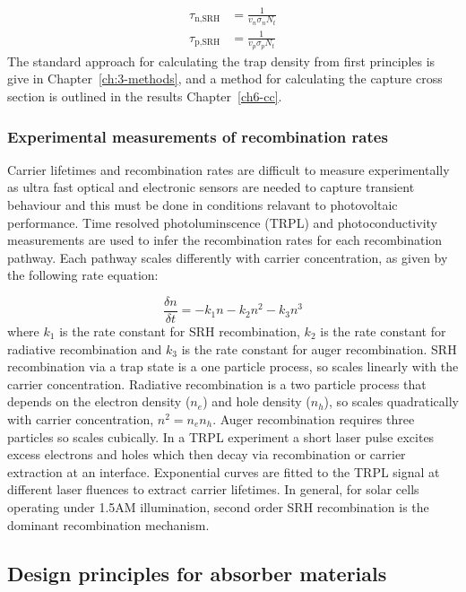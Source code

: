 \begin{align}
\tau_\textrm{n,SRH} &= \frac{1}{v_n\sigma_nN_t} \\
\tau_\textrm{p,SRH} &= \frac{1}{v_p\sigma_pN_t}  
\end{align}
The standard approach for calculating the trap density from first principles is give in Chapter\ \ref{ch:3-methods}, and a method for calculating the capture cross section is outlined in the results Chapter\ \ref{ch6-cc}.

\subsubsection{Experimental measurements of recombination rates} 

Carrier lifetimes and recombination rates are difficult to measure experimentally as ultra fast optical and electronic sensors are needed to capture transient behaviour and this must be done in conditions relavant to photovoltaic performance. Time resolved photoluminscence (TRPL) and photoconductivity measurements are used to infer the recombination rates for each recombination pathway.
Each pathway scales differently with carrier concentration, as given by the following rate equation:

$$ \frac{\delta n}{\delta t} = -k_1n -k_2n^2 -k_3n^3 $$
where $k_1$ is the rate constant for SRH recombination, $k_2$ is the rate constant for radiative recombination and $k_3$ is the rate constant for auger recombination. SRH recombination via a trap state is a one particle process, so scales linearly with the carrier concentration. Radiative recombination is a two particle process that depends on the electron density ($n_e$) and hole density ($n_h$), so scales quadratically with carrier concentration, $n^2=n_en_h$. Auger recombination requires three particles so scales cubically.
In a TRPL experiment a short laser pulse excites excess electrons and holes which then decay via recombination or carrier extraction at an interface. Exponential curves are fitted to the TRPL signal at different laser fluences to extract carrier lifetimes. In general, for solar cells operating under 1.5AM illumination, second order SRH recombination is the dominant recombination mechanism.
% 


 \subsection{Design principles for absorber materials}
 
